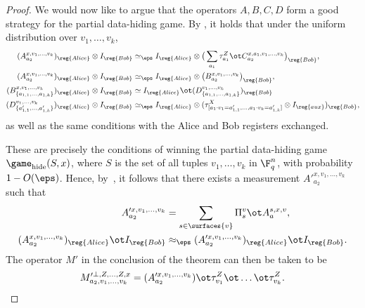 \begin{proof}
    We would now like to argue that the operators $A,
    B, C, D$ form a good strategy for the partial data-hiding game. By
    , it holds that under the uniform
    distribution over $v_1, \dots, v_k$,
    \begin{align*}
      (A^{x, v_1,\dots, v_k}_{a_2})_{\reg{Alice}} \otimes I_{\reg{Bob}}&\simeq_{\eps} I_{\reg{Alice}} \otimes \big(\sum_{a_1}
                                    \tau^Z_{a_1} \ot C^{x,
                                    a_1, v_1, \dots, v_k}_{a_2}\big)_{\reg{Bob}}, \\
      (A^{x, v_1, \dots, v_k}_{a_2})_{\reg{Alice}} \otimes I_{\reg{Bob}} &\simeq_{\eps} I_{\reg{Alice}} \otimes \big(
      				B^{x, v_1, \dots,
                                                                           v_k}_{a_2}\big)_{\reg{Bob}}, \\
      (B^{x, v_1, \dots, v_k}_{\{a_{1,1}, \dots,
      a_{1,k}\}})_{\reg{Alice}} \otimes I_{\reg{Bob}} &\simeq
                                                        I_{\reg{Alice}}
                                                        \ot (D^{v_1,
                                                        \dots,
                                                        v_k}_{\{a_{1,1},
                                                        \dots,
                                                        a_{1,k}\}})_{\reg{Bob}} \\
     (D^{ v_1, \dots, v_k}_{\{a'_{1,1}, \dots, a'_{1,k}\}})_{\reg{Alice}} \otimes I_{\reg{Bob}}
                                  &\simeq_{\eps} I_{\reg{Alice}} \otimes (\tau^X_{[a_1 \cdot
                                    v_1 = a'_{1,1}, \dots, a_1 \cdot
                                    v_k = a'_{1,k}]} \otimes
                                    I_{\reg{aux}})_{\reg{Bob}},
    \end{align*}
    as well as the same conditions with the Alice and Bob registers
    exchanged.
    
    These are precisely the conditions of winning the partial data-hiding game
    $\game_{\mathrm{hide}}(S,x)$, where $S$ is the set of all tuples
    $v_1, \dots, v_k$ in $\F_q^n$, with probability $1 -
    O(\eps)$. Hence, by~, it follows
    that there exists a measurement $A'^{x, v_1, \dots, v_k}_{a_2}$
    such that
    \begin{align*}
      A'^{x,v _1, \dots, v_k}_{a_2} &= \sum_{s \in
                                                       \surfaces{v}}
                                                       \Pi^{v}_s \ot
                                                       A^{s,x,v}_a,\\
      (A^{x,v_1, \dots, v_k}_{a_2})_{\reg{Alice}} \ot I_{\reg{Bob}} &\approx_{\eps} (A'^{x, v_1,
                                                      \dots, v_k}_{a_2})_{\reg{Alice}} \ot I_{\reg{Bob}}.
    \end{align*}
    The operator $M'$ in the conclusion of the theorem can then be
    taken to be
    \[M'^{\bot, Z, \dots, Z, x}_{a_2, v_1, \dots, v_k}  =
    (A'^{x,v_1, \dots, v_k}_{a_2}) \ot \tau^Z_{v_1} \ot \dots \ot
    \tau^Z_{v_k}. \qedhere\]
  \end{proof}

